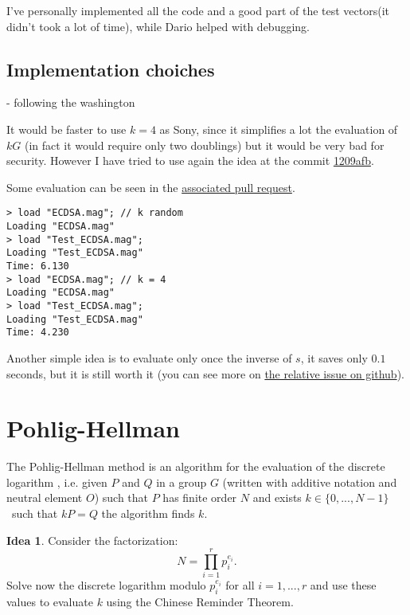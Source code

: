 \documentclass{article}
\theoremstyle{plain}
\theoremstyle{remark}
\theoremstyle{definition}
\newtheorem{idea}{Idea}
\begin{document}



I've personally implemented all the code and a good part of the test vectors(it didn't took a lot of time), while Dario helped with debugging.

\subsection{Implementation choiches}

- following the washington

It would be faster to use $k = 4$ as Sony, since it simplifies a lot the evaluation of $kG$ (in fact it would require only two doublings) but it would be very bad for security. However I have tried to use again the idea at the commit \href{https://github.com/giacomoborin/project2_MAGMA/commit/1209afbbb3bed86d26ebf342bf6f43453de3e795}{1209afb}.

Some evaluation can be seen in the \href{https://github.com/giacomoborin/project2_MAGMA/pull/36}{associated pull request}.

\begin{lstlisting}[language = magma]
> load "ECDSA.mag"; // k random
Loading "ECDSA.mag"
> load "Test_ECDSA.mag";
Loading "Test_ECDSA.mag"
Time: 6.130
> load "ECDSA.mag"; // k = 4    
Loading "ECDSA.mag"
> load "Test_ECDSA.mag";
Loading "Test_ECDSA.mag"
Time: 4.230
\end{lstlisting}


Another simple idea is to evaluate only once the inverse of $s$, it saves only $0.1$ seconds, but it is still worth it (you can see more on \href{https://github.com/giacomoborin/project2_MAGMA/issues/13}{the relative issue on github}).

\section{Pohlig-Hellman}

The Pohlig-Hellman method is an algorithm for the evaluation of the discrete logarithm %
, i.e. given $P$ and $Q$ in a group $G$ (written with additive notation and neutral element $O$) such that $P$ has finite order $N$ and exists $k\in \{0,...,N-1\}$ such that $kP = Q$ the algorithm finds $k$. 

\begin{idea} \label{idea:ecdlp}
	Consider the factorization:
\begin{equation*}
	N = \prod_{i=1}^r p_i^{e_i}.
\end{equation*}
	Solve now the discrete logarithm modulo $p_i^{e_i}$ for all $i = 1,...,r$ and use these values to evaluate $k$ using the Chinese Reminder Theorem. 
\end{idea}
\end{document}
